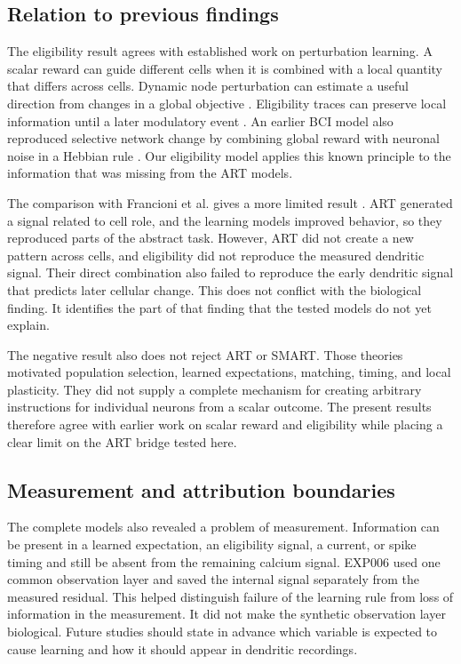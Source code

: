 \documentclass[11pt]{article}
\begin{document}
\subsection{Relation to previous findings}
The eligibility result agrees with established work on perturbation learning. A scalar reward can guide different cells when it is combined with a local quantity that differs across cells. Dynamic node perturbation can estimate a useful direction from changes in a global objective \citep{fiete2006}. Eligibility traces can preserve local information until a later modulatory event \citep{izhikevich2007,gerstner2018}. An earlier BCI model also reproduced selective network change by combining global reward with neuronal noise in a Hebbian rule \citep{legenstein2010}. Our eligibility model applies this known principle to the information that was missing from the ART models.

The comparison with Francioni et al. gives a more limited result \citep{francioni2026}. ART generated a signal related to cell role, and the learning models improved behavior, so they reproduced parts of the abstract task. However, ART did not create a new pattern across cells, and eligibility did not reproduce the measured dendritic signal. Their direct combination also failed to reproduce the early dendritic signal that predicts later cellular change. This does not conflict with the biological finding. It identifies the part of that finding that the tested models do not yet explain.

The negative result also does not reject ART or SMART. Those theories motivated population selection, learned expectations, matching, timing, and local plasticity. They did not supply a complete mechanism for creating arbitrary instructions for individual neurons from a scalar outcome. The present results therefore agree with earlier work on scalar reward and eligibility while placing a clear limit on the ART bridge tested here.

\subsection{Measurement and attribution boundaries}
The complete models also revealed a problem of measurement. Information can be present in a learned expectation, an eligibility signal, a current, or spike timing and still be absent from the remaining calcium signal. EXP006 used one common observation layer and saved the internal signal separately from the measured residual. This helped distinguish failure of the learning rule from loss of information in the measurement. It did not make the synthetic observation layer biological. Future studies should state in advance which variable is expected to cause learning and how it should appear in dendritic recordings.
\end{document}
